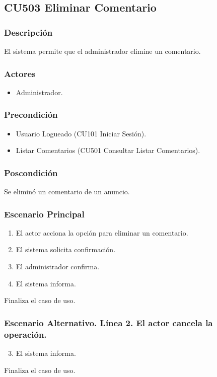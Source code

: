 \subsection{CU503 Eliminar Comentario}
\subsubsection{Descripci\'{o}n}
El sistema permite que el administrador elimine un comentario.
\subsubsection{Actores}
\begin{itemize}
\item Administrador.
\end{itemize}
\subsubsection{Precondici\'{o}n}
\begin{itemize}
\item Usuario Logueado (CU101 Iniciar Sesi\'{o}n).
\item Listar Comentarios (CU501 Consultar Listar Comentarios).
\end{itemize}
\subsubsection{Poscondici\'{o}n}
Se elimin\'{o} un comentario de un anuncio.
\subsubsection{Escenario Principal}
\begin{enumerate}
\item El actor acciona la opci\'{o}n para eliminar un comentario.
\item El sistema solicita confirmaci\'{o}n.
\item El administrador confirma.
\item El sistema informa.
\end{enumerate}
Finaliza el caso de uso.
\subsubsection{Escenario Alternativo. L\'{i}nea 2. El actor cancela la operaci\'{o}n.}
\begin{enumerate}
\setcounter{enumi}{2}
\item El sistema informa.
\end{enumerate}
Finaliza el caso de uso.
